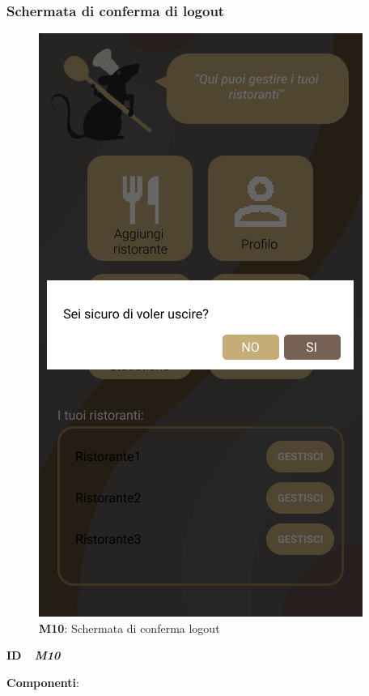         \subsubsection{Schermata di conferma di logout}
          \begin{figure}[H]
            \centering
            \includegraphics[scale=0.5]{assets/diagrammi/Mockup/Mockup_ExitDialog.png}
            \caption*{\textbf{M10}: Schermata di conferma logout}\label{fig:Mockup_ExitDialog}
          \end{figure}

          \begin{flushleft}
            \textbf{ID}   \ \Large{ \emph{\textbf{M10}}}
          \end{flushleft}

          \textbf{Componenti}:

